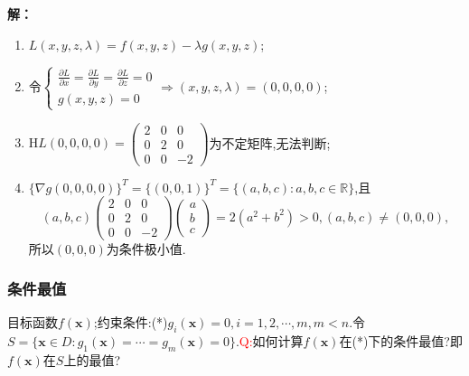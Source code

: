 \documentclass[UTF8]{ctexart}
\newcommand{\p}[2]{\frac{\partial #1}{\partial #2}}
\newcommand{\x}{\boldsymbol{x}}
\begin{document}
    \textbf{解：}\begin{enumerate}[(1)]
        \item $L(x,y,z,\lambda)=f(x,y,z)-\lambda g(x,y,z)$;
        \item 令$\begin{cases}
            \p{L}{x}=\p{L}{y}=\p{L}{z}=0\\
            g(x,y,z)=0
        \end{cases}\Rightarrow(x,y,z,\lambda)=(0,0,0,0)$;
        \item $\mathrm{H}L(0,0,0,0)=\begin{pmatrix}
            2&0&0\\
            0&2&0\\
            0&0&-2
        \end{pmatrix}$为不定矩阵,无法判断;
        \item $\{\nabla g(0,0,0,0)\}^T=\{(0,0,1)\}^T=\{(a,b,c):a,b,c\in\mathbb{R}\}$,且$$(a,b,c)\begin{pmatrix}
            2&0&0\\
            0&2&0\\
            0&0&-2
        \end{pmatrix}\begin{pmatrix}
            a\\
            b\\
            c
        \end{pmatrix}=2(a^2+b^2)>0,(a,b,c)\not=(0,0,0),$$
        所以$(0,0,0)$为条件极小值.
    \end{enumerate}

    \subsubsection{条件最值}
    目标函数$f(\x)$;约束条件:(*)$g_i(\x)=0,i=1,2,\cdots,m,m<n$.令$S=\{\x\in D:g_1(\x)=\cdots=g_m(\x)=0\}$.\textcolor{red}{Q:}如何计算$f(\x)$在(*)下的条件最值?即$f(\x)$在$S$上的最值?
\end{document}
